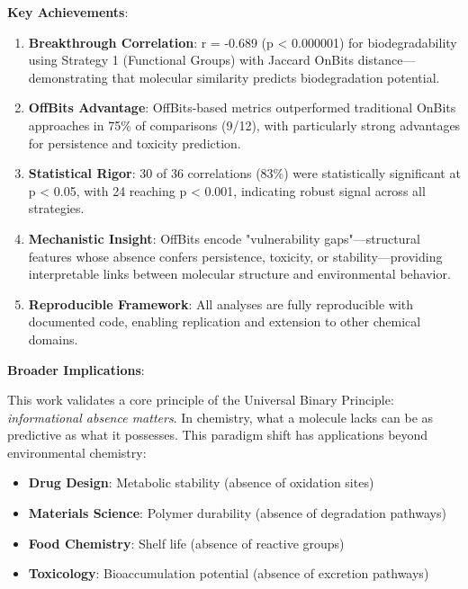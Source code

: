 \documentclass[11pt,letterpaper]{article}
\begin{document}
\textbf{Key Achievements}:
\begin{enumerate}
    \item \textbf{Breakthrough Correlation}: r = -0.689 (p < 0.000001) for biodegradability using Strategy 1 (Functional Groups) with Jaccard OnBits distance—demonstrating that molecular similarity predicts biodegradation potential.

    \item \textbf{OffBits Advantage}: OffBits-based metrics outperformed traditional OnBits approaches in 75\% of comparisons (9/12), with particularly strong advantages for persistence and toxicity prediction.

    \item \textbf{Statistical Rigor}: 30 of 36 correlations (83\%) were statistically significant at p < 0.05, with 24 reaching p < 0.001, indicating robust signal across all strategies.

    \item \textbf{Mechanistic Insight}: OffBits encode "vulnerability gaps"—structural features whose absence confers persistence, toxicity, or stability—providing interpretable links between molecular structure and environmental behavior.

    \item \textbf{Reproducible Framework}: All analyses are fully reproducible with documented code, enabling replication and extension to other chemical domains.
\end{enumerate}

\textbf{Broader Implications}:

This work validates a core principle of the Universal Binary Principle: \textit{informational absence matters}. In chemistry, what a molecule lacks can be as predictive as what it possesses. This paradigm shift has applications beyond environmental chemistry:

\begin{itemize}
    \item \textbf{Drug Design}: Metabolic stability (absence of oxidation sites)
    \item \textbf{Materials Science}: Polymer durability (absence of degradation pathways)
    \item \textbf{Food Chemistry}: Shelf life (absence of reactive groups)
    \item \textbf{Toxicology}: Bioaccumulation potential (absence of excretion pathways)
\end{itemize}
\end{document}
